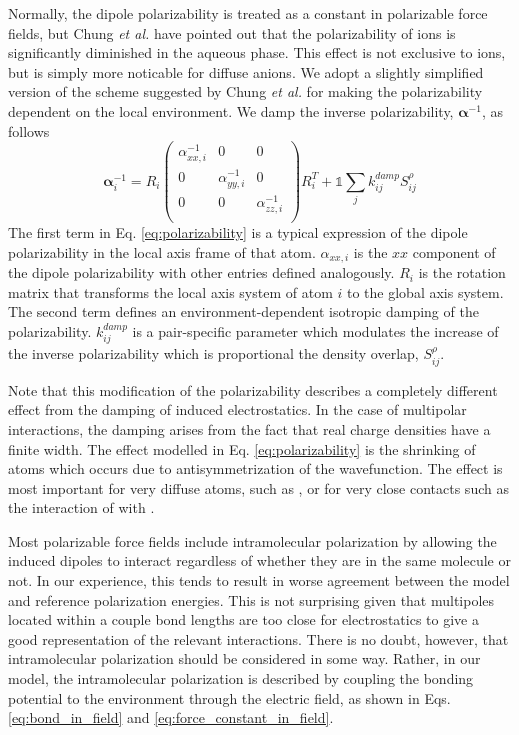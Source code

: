 \documentclass[journal=jacsat,manuscript=article]{achemso}
\begin{document}
Normally, the dipole polarizability is treated as a constant in polarizable force fields,
but Chung \textit{et al.} have pointed out that the polarizability of ions
is significantly diminished in the aqueous phase.\cite{chung2022classical}
This effect is not exclusive to ions, but is simply more noticable for diffuse anions. We adopt a slightly
simplified version of the scheme suggested by Chung \textit{et al.} for making the polarizability dependent on the local
environment. We damp the inverse polarizability, $\bm{\alpha}^{-1}$, as follows
\begin{equation}
  \bm{\alpha}^{-1}_i=
  R_i\begin{pmatrix}
    \alpha^{-1}_{xx,i} & 0 & 0 \\
    0 & \alpha^{-1}_{yy,i} & 0 \\
    0 & 0 & \alpha^{-1}_{zz,i} \\
  \end{pmatrix}R_i^T
    +\mathds{1}\sum_{j}k^{damp}_{ij}S_{ij}^\rho
    \label{eq:polarizability}
\end{equation}
\noindent
The first term in Eq. \ref{eq:polarizability} is a typical expression of the dipole polarizability
in the local axis frame of that atom. $\alpha_{xx,i}$ is the $xx$ component of the dipole polarizability
with other entries defined analogously. $R_i$ is the rotation matrix that transforms the local
axis system of atom $i$ to the global axis system. The second term defines an environment-dependent
isotropic damping of the polarizability.
$k_{ij}^{damp}$ is a pair-specific parameter which modulates the increase of the inverse polarizability
which is proportional the density overlap, $S_{ij}^\rho$.

Note that this modification of the polarizability describes a completely different
effect from the damping of induced electrostatics. In the case of multipolar interactions,
the damping arises from the fact that real charge densities have a finite width. The effect
modelled in Eq. \ref{eq:polarizability} is the shrinking of atoms which occurs due to
antisymmetrization of the wavefunction. The effect is most important for very diffuse atoms, such as ,
or for very close contacts such as the interaction of  with .

Most polarizable force fields include intramolecular polarization by allowing the induced
dipoles to interact regardless of whether they are in the same molecule or not. In our
experience, this tends to result in worse agreement between the model and reference polarization
energies. This is not surprising given that multipoles located within a couple bond lengths
are too close for electrostatics to give a good representation of the relevant interactions.
There is no doubt, however, that intramolecular polarization should be considered in some way.
Rather, in our model, the intramolecular polarization is described by coupling the bonding potential
to the environment through the electric field, as shown in Eqs. \ref{eq:bond_in_field} and \ref{eq:force_constant_in_field}.
\end{document}
